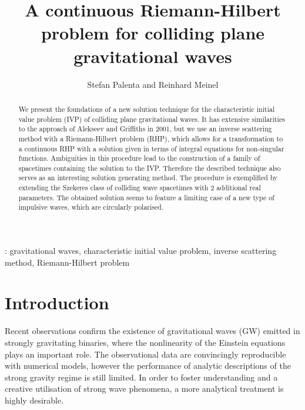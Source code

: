 \documentclass[12pt]{iopart}
\begin{document}
\title{A continuous Riemann-Hilbert problem for colliding plane gravitational waves}

\author{Stefan Palenta and Reinhard Meinel}

\address{Theoretisch-Physikalisches Institut, Friedrich-Schiller-Universit\"{a}t
Jena, Max-Wien-Platz 1, 07743 Jena, Germany}

\begin{abstract}
We present the foundations of a new solution technique for the characteristic initial value problem (IVP) of colliding plane gravitational waves. It has extensive similarities to the approach of Alekseev and Griffiths in 2001, but we use an inverse scattering method with a Riemann-Hilbert problem (RHP), which allows for a transformation to a continuous RHP with a solution given in terms of integral equations for non-singular functions. Ambiguities in this procedure lead to the construction of a family of spacetimes containing the solution to the IVP. Therefore the described technique also serves as an interesting solution generating method. The procedure is exemplified by extending the Szekeres class of colliding wave spacetimes with 2 additional real parameters. The obtained solution seems to feature a limiting case of a new type of impulsive waves, which are circularly polarised.
\end{abstract}
: gravitational waves, characteristic initial value problem, inverse scattering method, Riemann-Hilbert problem




\section{Introduction}

Recent observations confirm the existence of gravitational waves (GW) emitted in strongly gravitating binaries, where the nonlinearity of the Einstein equations plays an important role. The observational data are convincingly reproducible with numerical models, however the performance of analytic descriptions of the strong gravity regime is still limited. In order to foster understanding and a creative utilisation of strong wave phenomena, a more analytical treatment is highly desirable.
\end{document}
